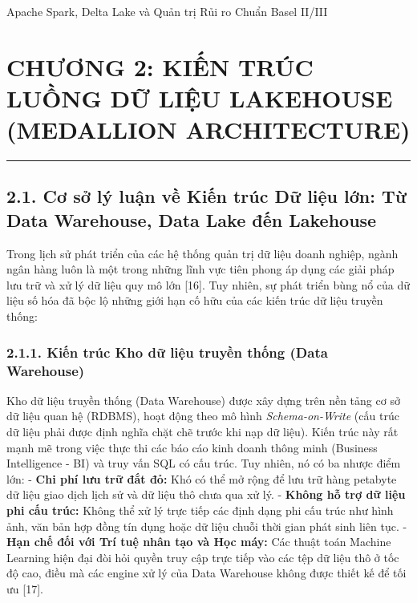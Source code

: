 \documentclass[
  13pt,
  a4paper,
]{report}
\begin{document}
Apache Spark, Delta Lake và Quản trị Rủi ro Chuẩn Basel II/III

\hfill\break


\chapter{CHƯƠNG 2: KIẾN TRÚC LUỒNG DỮ LIỆU LAKEHOUSE (MEDALLION
ARCHITECTURE)}\label{chux1b0ux1a1ng-2-kiux1ebfn-truxfac-luux1ed3ng-dux1eef-liux1ec7u-lakehouse-medallion-architecture-1}

\begin{center}\rule{0.5\linewidth}{0.5pt}\end{center}

\section{2.1. Cơ sở lý luận về Kiến trúc Dữ liệu lớn: Từ Data Warehouse,
Data Lake đến
Lakehouse}\label{cux1a1-sux1edf-luxfd-luux1eadn-vux1ec1-kiux1ebfn-truxfac-dux1eef-liux1ec7u-lux1edbn-tux1eeb-data-warehouse-data-lake-ux111ux1ebfn-lakehouse}

Trong lịch sử phát triển của các hệ thống quản trị dữ liệu doanh nghiệp,
ngành ngân hàng luôn là một trong những lĩnh vực tiên phong áp dụng các
giải pháp lưu trữ và xử lý dữ liệu quy mô lớn {[}16{]}. Tuy nhiên, sự
phát triển bùng nổ của dữ liệu số hóa đã bộc lộ những giới hạn cố hữu
của các kiến trúc dữ liệu truyền thống:

\subsection{2.1.1. Kiến trúc Kho dữ liệu truyền thống (Data
Warehouse)}\label{kiux1ebfn-truxfac-kho-dux1eef-liux1ec7u-truyux1ec1n-thux1ed1ng-data-warehouse}

Kho dữ liệu truyền thống (Data Warehouse) được xây dựng trên nền tảng cơ
sở dữ liệu quan hệ (RDBMS), hoạt động theo mô hình
\emph{Schema-on-Write} (cấu trúc dữ liệu phải được định nghĩa chặt chẽ
trước khi nạp dữ liệu). Kiến trúc này rất mạnh mẽ trong việc thực thi
các báo cáo kinh doanh thông minh (Business Intelligence - BI) và truy
vấn SQL có cấu trúc. Tuy nhiên, nó có ba nhược điểm lớn: - \textbf{Chi
phí lưu trữ đắt đỏ:} Khó có thể mở rộng để lưu trữ hàng petabyte dữ liệu
giao dịch lịch sử và dữ liệu thô chưa qua xử lý. - \textbf{Không hỗ trợ
dữ liệu phi cấu trúc:} Không thể xử lý trực tiếp các định dạng phi cấu
trúc như hình ảnh, văn bản hợp đồng tín dụng hoặc dữ liệu chuỗi thời
gian phát sinh liên tục. - \textbf{Hạn chế đối với Trí tuệ nhân tạo và
Học máy:} Các thuật toán Machine Learning hiện đại đòi hỏi quyền truy
cập trực tiếp vào các tệp dữ liệu thô ở tốc độ cao, điều mà các engine
xử lý của Data Warehouse không được thiết kế để tối ưu {[}17{]}.
\end{document}
